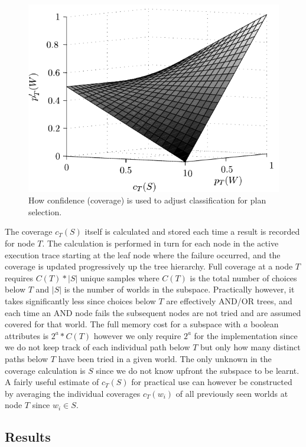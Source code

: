 \begin{figure}[ht]
   \centering
   \includegraphics[width=\columnwidth]{figs/coverage-surface}
   \caption{How confidence (coverage) is used to adjust \dt classification for plan selection.}
   \label{fig:coverage-surface}
\end{figure}


The coverage $c_T(S)$ itself is calculated and stored each time a result is recorded for node $T$. The calculation is performed in turn for each node in the active execution trace starting at the leaf node where the failure occurred, and the coverage is updated progressively up the tree hierarchy. Full coverage at a node $T$ requires $C(T)*|S|$ unique samples where $C(T)$ is the total number of choices below $T$ and $|S|$ is the number of worlds in the subspace. Practically however, it takes significantly less since choices below $T$ are effectively AND/OR trees, and each time an AND node fails the subsequent nodes are not tried and are assumed covered for that world. The full memory cost for a subspace with $a$ boolean attributes is $2^a*C(T)$ however we only require $2^a$ for the implementation since we do not keep track of each individual path below $T$ but only how many distinct paths below $T$ have been tried in a given world. The only unknown in the coverage calculation is $S$ since we do not know upfront the subspace to be learnt. A fairly useful estimate of $c_T(S)$ for practical use can however be constructed by averaging the individual coverages $c_T(w_i)$ of all previously seen worlds at node $T$ since $w_i \in S$. 

\subsection{Results}


